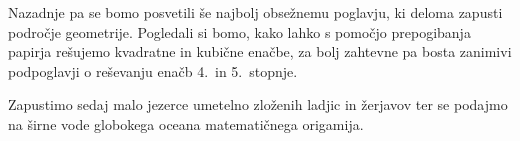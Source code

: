 Nazadnje pa se bomo posvetili še najbolj obsežnemu poglavju, ki deloma zapusti področje geometrije. Pogledali si bomo, kako lahko s pomočjo prepogibanja papirja rešujemo kvadratne in kubične enačbe, za bolj zahtevne pa bosta zanimivi podpoglavji o reševanju enačb 4.\ in 5.\ stopnje.

Zapustimo sedaj malo jezerce umetelno zloženih ladjic in žerjavov ter se podajmo na širne vode globokega oceana matematičnega origamija.